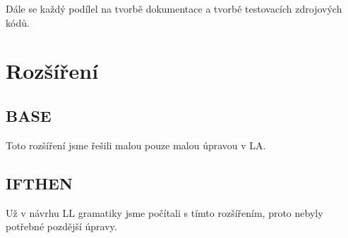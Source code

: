 \documentclass[11pt, a4paper]{article}
\begin{document}
Dále se každý podílel na tvorbě dokumentace a tvorbě testovacích zdrojových kódů.
\iffalse
\begin{comment}
\begin{figure}[ht]
\begin{center}
\texttt{[image: etiopan.eps]}\hspace{-0.2em}
\reflectbox{\texttt{[image: etiopan.eps]}}
\caption{Malý Etiopánek a jeho bratříček}
\label{pic:1}
\end{center}
\end{figure}

\newpage
Rozdíl mezi vektorovým\dots
\begin{figure}[ht]
\begin{center}
\texttt{[image: oniisan.eps]}
\caption{Vektorový obrázek}
\label{pic:2}
\end{center}
\end{figure}


\noindent \dots a bitmapovým obrázkem
\begin{figure}[ht]
\begin{center}
\texttt{[image: oniisan2.eps]}
\caption{Bitmapový obrázek}
\label{pic:3}
\end{center}
\end{figure}

\noindent se projeví například při zvětšení.

Odkazy (nejen ty) na obrázky \ref{pic:1}, \ref{pic:2} a \ref{pic:3}, na  
tabulky \ref{tab:1} a \ref{tab:2} a také na algoritmus \ref{algoritmus:1} jsou udělány pomocí~křížových odkazů. Pak je ovšem potřeba zdrojový soubor přeložit dvakrát.


\end{figure}


\end{comment}
\fi

\section{Rozšíření}
\subsection{BASE}
Toto rozšíření jsme řešili malou pouze malou úpravou v LA.  
\subsection{IFTHEN}
Už v návrhu LL gramatiky jsme počítali s tímto rozšířením, proto nebyly potřebné pozdější úpravy.  
\end{document}
